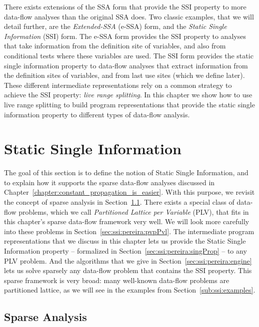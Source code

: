 There exists extensions of the SSA form that provide the SSI property to more
data-flow analyses than the original SSA does.
Two classic examples, that we will detail further, are the {\em Extended-SSA} (e-SSA) form, and the {\em Static Single Information} (SSI) form.
The e-SSA form provides the SSI property to analyses that take information from
the definition site of variables, and also from conditional tests where these
variables are used.
The SSI form provides the static single information property to data-flow
analyses that extract information from the definition sites of variables, and from last use sites (which we define later).
These different intermediate representations rely on a common strategy to achieve the SSI property: {\em live range splitting}.
In this chapter we show how to use live range splitting to build program
representations that provide the static single information property to different
types of data-flow analysis.

\section{Static Single Information}
\label{sec:ssi:pereira:single}

The goal of this section is to define the notion of Static Single Information, and to explain how it supports the sparse data-flow analyses discussed in Chapter~\ref{chapter:constant_propagation_is_easier}.
With this purpose, we revisit the concept of sparse analysis in Section~\ref{sec:ssi:pereira:sparse}.
There exists a special class of data-flow problems, which we call {\em Partitioned Lattice per Variable} (PLV), that fits in this chapter's sparse data-flow framework very well.
We will look more carefully into these problems in Section~\ref{sec:ssi:pereira:pvpPvl}.
The intermediate program representations that we discuss in this chapter lets us provide the Static Single Information property -- formalized in Section~\ref{sec:ssi:pereira:singProp} -- to any PLV problem.
And the algorithms that we give in Section~\ref{sec:ssi:pereira:engine} lets us solve sparsely any data-flow problem that contains the SSI property.
This sparse framework is very broad: many well-known data-flow problems are partitioned lattice, as we will see in the examples from Section~\ref{sub:ssi:examples}.


\subsection{Sparse Analysis}
\label{sec:ssi:pereira:sparse}

